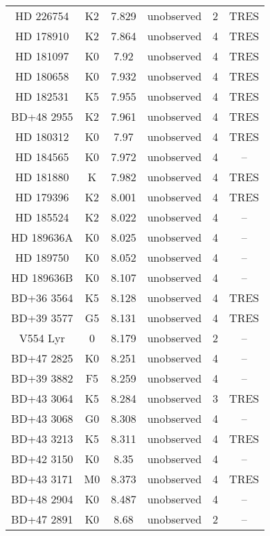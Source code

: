 \begin{table*}
\begin{tabular}{cccccc}
HD 226754 & K2 & 7.829 & unobserved & 2 & TRES \\
HD 178910 & K2 & 7.864 & unobserved & 4 & TRES \\
HD 181097 & K0 & 7.92 & unobserved & 4 & TRES \\
HD 180658 & K0 & 7.932 & unobserved & 4 & TRES \\
HD 182531 & K5 & 7.955 & unobserved & 4 & TRES \\
BD+48 2955 & K2 & 7.961 & unobserved & 4 & TRES \\
HD 180312 & K0 & 7.97 & unobserved & 4 & TRES \\
HD 184565 & K0 & 7.972 & unobserved & 4 & -- \\
HD 181880 & K & 7.982 & unobserved & 4 & TRES \\
HD 179396 & K2 & 8.001 & unobserved & 4 & TRES \\
HD 185524 & K2 & 8.022 & unobserved & 4 & -- \\
HD 189636A & K0 & 8.025 & unobserved & 4 & -- \\
HD 189750 & K0 & 8.052 & unobserved & 4 & -- \\
HD 189636B & K0 & 8.107 & unobserved & 4 & -- \\
BD+36 3564 & K5 & 8.128 & unobserved & 4 & TRES \\
BD+39 3577 & G5 & 8.131 & unobserved & 4 & TRES \\
V554 Lyr & 0 & 8.179 & unobserved & 2 & -- \\
BD+47 2825 & K0 & 8.251 & unobserved & 4 & -- \\
BD+39 3882 & F5 & 8.259 & unobserved & 4 & -- \\
BD+43 3064 & K5 & 8.284 & unobserved & 3 & TRES \\
BD+43 3068 & G0 & 8.308 & unobserved & 4 & -- \\
BD+43 3213 & K5 & 8.311 & unobserved & 4 & TRES \\
BD+42 3150 & K0 & 8.35 & unobserved & 4 & -- \\
BD+43 3171 & M0 & 8.373 & unobserved & 4 & TRES \\
BD+48 2904 & K0 & 8.487 & unobserved & 4 & -- \\
BD+47 2891 & K0 & 8.68 & unobserved & 2 & -- \\
\hline
\end{tabular}
\end{table*}
